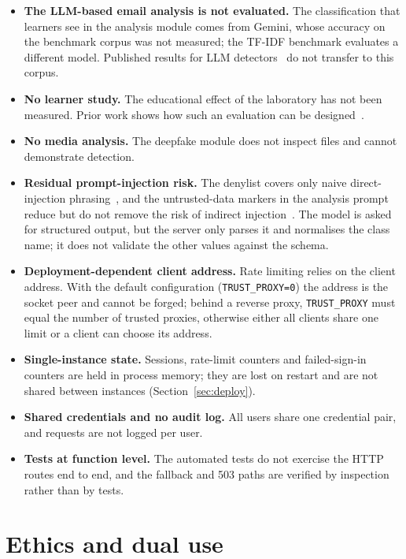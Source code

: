 \begin{itemize}
\item \textbf{The LLM-based email analysis is not evaluated.} The classification that learners see in the analysis module comes from Gemini, whose accuracy on the benchmark corpus was not measured; the TF-IDF benchmark evaluates a different model. Published results for LLM detectors~\cite{koide2024chatspamdetector} do not transfer to this corpus.
\item \textbf{No learner study.} The educational effect of the laboratory has not been measured. Prior work shows how such an evaluation can be designed~\cite{sheng2007phil}.
\item \textbf{No media analysis.} The deepfake module does not inspect files and cannot demonstrate detection.
\item \textbf{Residual prompt-injection risk.} The denylist covers only naive direct-injection phrasing~\cite{perez2022ignore}, and the untrusted-data markers in the analysis prompt reduce but do not remove the risk of indirect injection~\cite{greshake2023signed}. The model is asked for structured output, but the server only parses it and normalises the class name; it does not validate the other values against the schema.
\item \textbf{Deployment-dependent client address.} Rate limiting relies on the client address. With the default configuration (\texttt{TRUST\_PROXY=0}) the address is the socket peer and cannot be forged; behind a reverse proxy, \texttt{TRUST\_PROXY} must equal the number of trusted proxies, otherwise either all clients share one limit or a client can choose its address.
\item \textbf{Single-instance state.} Sessions, rate-limit counters and failed-sign-in counters are held in process memory; they are lost on restart and are not shared between instances (Section~\ref{sec:deploy}).
\item \textbf{Shared credentials and no audit log.} All users share one credential pair, and requests are not logged per user.
\item \textbf{Tests at function level.} The automated tests do not exercise the HTTP routes end to end, and the fallback and 503 paths are verified by inspection rather than by tests.
\end{itemize}

\section{Ethics and dual use}
\label{sec:ethics}


